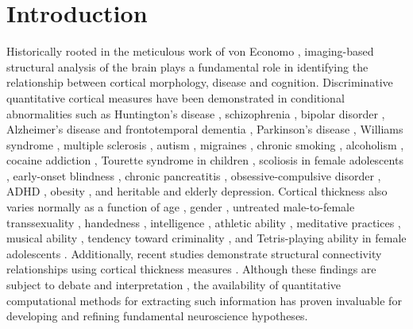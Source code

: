 \section{Introduction}

Historically rooted in the meticulous work of von Economo \citep{economo2008},
imaging-based structural analysis of the brain plays a fundamental role
in identifying the relationship between cortical morphology, disease and cognition.
Discriminative quantitative cortical measures have been demonstrated in conditional 
abnormalities such as 
Huntington's disease \citep{rosas2002,rosas2005,selemon2004}, 
schizophrenia \citep{nesvag2008}, bipolar disorder \cite{lyoo2006}, Alzheimer's disease and frontotemporal
dementia \citep{du2007,dickerson2009}, Parkinson's disease \citep{jubault2011}, Williams syndrome \citep{thompson2005},
multiple sclerosis \citep{ramasamy2009}, autism \citep{chung2005,hardan2006},
migraines \citep{dasilva2007}, chronic smoking \citep{kuhn2010}, alcoholism \citep{fortier2011},
cocaine addiction \citep{makris2008}, Tourette syndrome in children \citep{sowell2008},
scoliosis in
female adolescents \citep{wang2012}, 
early-onset blindness \citep{jiang2009},
chronic pancreatitis \citep{frokjaer2012},
obsessive-compulsive disorder \citep{shin2007}, ADHD \citep{almeida-montes2012}, obesity \citep{raji2010}, and heritable \citep{peterson2009}
and elderly \citep{ballmaier2004} depression.  Cortical thickness also
varies normally as a function of age \citep{kochunov2011},
gender \citep{luders2006a}, untreated
male-to-female transsexuality \citep{luders2012},  handedness
\citep{luders2006,amunts2007}, intelligence \citep{shaw2006}, athletic
ability \citep{wei2011}, meditative practices \cite{lazar2005}, musical ability \citep{bermudez2009,foster2010}, 
tendency toward criminality \citep{raine2011}, and Tetris-playing
ability in female adolescents \citep{haier2009}.  Additionally,
recent studies demonstrate structural 
connectivity relationships using cortical thickness measures
\citep{worsley2005,lerch2006,he2007,chen2008}.
Although these findings
are subject to debate and interpretation \citep{gernsbacher2007}, 
the availability of quantitative
computational methods for extracting such information
has proven invaluable for developing and refining fundamental 
neuroscience hypotheses.

